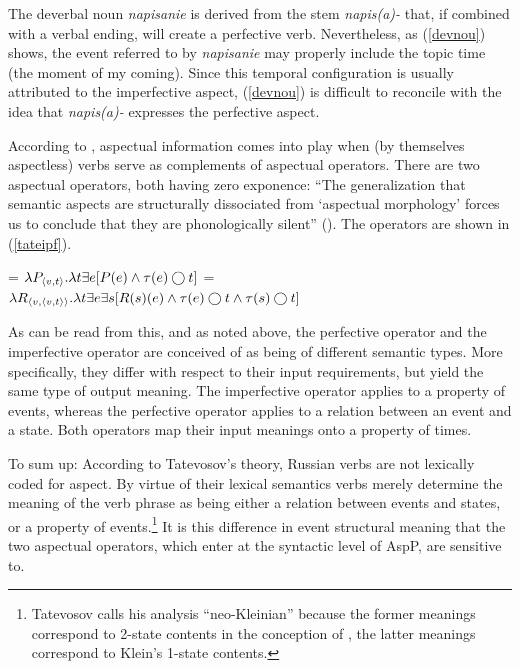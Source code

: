 \documentclass[output=paper,colorlinks,citecolor=brown]{langscibook}
\begin{document}
\noindent The deverbal noun \textit{napisanie} is derived from the stem \textit{napis(a)-} that, if combined with a verbal ending, will create a perfective verb.
Nevertheless, as (\ref{devnou}) shows, the event referred to by \textit{napisanie} may properly include the topic time (the moment of my coming). Since this temporal configuration is usually attributed to the imperfective aspect, (\ref{devnou}) is difficult to reconcile with the idea that \textit{napis(a)-} expresses the perfective aspect.

According to \citet{Tate17}, aspectual information comes into play when (by themselves aspectless) verbs serve as complements of aspectual operators. There are two aspectual operators, both having zero exponence: ``The generalization that semantic aspects are structurally dissociated from `aspectual morphology' forces us to conclude that they are phonologically silent'' (\citealt[26]{Tate17}).
The operators are shown in (\ref{tateipf}).

\ea\label{tateipf}
\ea {} = $\lambda P_{\langle{v,t}\rangle}. \lambda t \exists e [P(e) \wedge \tau(e) \bigcirc t ]$ \label{tateipfa}
\ex {} = $\lambda R_{\langle{v,\langle{v,t}\rangle}\rangle}. \lambda t \exists e \exists s [R(s)(e) \wedge \tau(e) \bigcirc t \wedge \tau(s) \bigcirc t ]$ \label{tateipfb}
\z
\z

\noindent As can be read from this, and as noted above, the perfective operator and the imperfective operator are conceived of as being of different semantic types. More specifically, they differ with respect to their input requirements, but yield the same type of output meaning. The imperfective operator applies to a property of events, whereas the perfective operator applies to a relation between an event and a state. Both operators map their input meanings onto a property of times.   

To sum up: According to Tatevosov's theory, Russian verbs are not lexically coded for aspect. By virtue of their lexical semantics verbs merely determine the meaning of the verb phrase as being either a relation between events and states, or a property of events.\footnote{Tatevosov calls his analysis ``neo-Kleinian'' because the former meanings correspond to 2-state contents in the conception of \citet{Klein1995}, the latter meanings correspond to Klein's 1-state contents.} It is this difference in event structural meaning that the two aspectual operators, which enter at the syntactic level of AspP, are sensitive to. 
\end{document}

